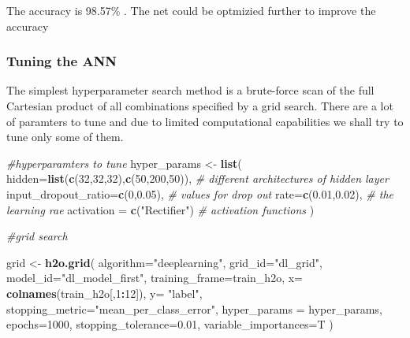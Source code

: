 \documentclass[]{article}
\newenvironment{Shaded}{\begin{snugshade}}{\end{snugshade}}
\newcommand{\KeywordTok}[1]{\textcolor[rgb]{0.13,0.29,0.53}{\textbf{#1}}}
\newcommand{\DataTypeTok}[1]{\textcolor[rgb]{0.13,0.29,0.53}{#1}}
\newcommand{\DecValTok}[1]{\textcolor[rgb]{0.00,0.00,0.81}{#1}}
\newcommand{\FloatTok}[1]{\textcolor[rgb]{0.00,0.00,0.81}{#1}}
\newcommand{\StringTok}[1]{\textcolor[rgb]{0.31,0.60,0.02}{#1}}
\newcommand{\CommentTok}[1]{\textcolor[rgb]{0.56,0.35,0.01}{\textit{#1}}}
\newcommand{\OperatorTok}[1]{\textcolor[rgb]{0.81,0.36,0.00}{\textbf{#1}}}
\newcommand{\NormalTok}[1]{#1}
\begin{document}
The accuracy is 98.57\% . The net could be optmizied further to improve
the accuracy

\subsubsection{Tuning the ANN}\label{tuning-the-ann}

The simplest hyperparameter search method is a brute-force scan of the
full Cartesian product of all combinations specified by a grid search.
There are a lot of paramters to tune and due to limited computational
capabilities we shall try to tune only some of them.

\begin{Shaded}
\begin{Highlighting}[]
\CommentTok{#hyperparamters to tune }
\NormalTok{hyper_params <-}\StringTok{ }\KeywordTok{list}\NormalTok{(}
  \DataTypeTok{hidden=}\KeywordTok{list}\NormalTok{(}\KeywordTok{c}\NormalTok{(}\DecValTok{32}\NormalTok{,}\DecValTok{32}\NormalTok{,}\DecValTok{32}\NormalTok{),}\KeywordTok{c}\NormalTok{(}\DecValTok{50}\NormalTok{,}\DecValTok{200}\NormalTok{,}\DecValTok{50}\NormalTok{)),  }\CommentTok{# different architectures of hidden layer}
  \DataTypeTok{input_dropout_ratio=}\KeywordTok{c}\NormalTok{(}\DecValTok{0}\NormalTok{,}\FloatTok{0.05}\NormalTok{),      }\CommentTok{# values for drop out}
  \DataTypeTok{rate=}\KeywordTok{c}\NormalTok{(}\FloatTok{0.01}\NormalTok{,}\FloatTok{0.02}\NormalTok{),                  }\CommentTok{# the learning rae}
  \DataTypeTok{activation =} \KeywordTok{c}\NormalTok{(}\StringTok{"Rectifier"}\NormalTok{)   }\CommentTok{# activation functions}
\NormalTok{)}

\CommentTok{#grid search}

\NormalTok{grid <-}\StringTok{ }\KeywordTok{h2o.grid}\NormalTok{(}
  \DataTypeTok{algorithm=}\StringTok{"deeplearning"}\NormalTok{,}
  \DataTypeTok{grid_id=}\StringTok{"dl_grid"}\NormalTok{,}
  \DataTypeTok{model_id=}\StringTok{"dl_model_first"}\NormalTok{, }
  \DataTypeTok{training_frame=}\NormalTok{train_h2o, }
  \DataTypeTok{x=} \KeywordTok{colnames}\NormalTok{(train_h2o[,}\DecValTok{1}\OperatorTok{:}\DecValTok{12}\NormalTok{]),}
  \DataTypeTok{y=} \StringTok{"label"}\NormalTok{,}
  \DataTypeTok{stopping_metric=}\StringTok{"mean_per_class_error"}\NormalTok{,}
  \DataTypeTok{hyper_params =}\NormalTok{ hyper_params,}
  \DataTypeTok{epochs=}\DecValTok{1000}\NormalTok{,   }
  \DataTypeTok{stopping_tolerance=}\FloatTok{0.01}\NormalTok{,}
  \DataTypeTok{variable_importances=}\NormalTok{T    }
\NormalTok{)}
\end{Highlighting}
\end{Shaded}
\end{document}
